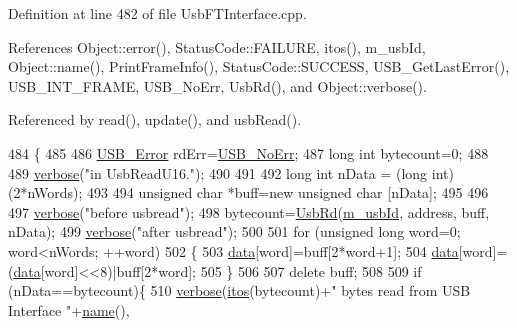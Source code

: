 Definition at line 482 of file Usb\+F\+T\+Interface.\+cpp.



References Object\+::error(), Status\+Code\+::\+F\+A\+I\+L\+U\+RE, itos(), m\+\_\+usb\+Id, Object\+::name(), Print\+Frame\+Info(), Status\+Code\+::\+S\+U\+C\+C\+E\+SS, U\+S\+B\+\_\+\+Get\+Last\+Error(), U\+S\+B\+\_\+\+I\+N\+T\+\_\+\+F\+R\+A\+ME, U\+S\+B\+\_\+\+No\+Err, Usb\+Rd(), and Object\+::verbose().



Referenced by read(), update(), and usb\+Read().


\begin{DoxyCode}
484                                                                \{
485   
486   \hyperlink{LALUsbML_8h_aa7e5a2302774d5aa1d48a2a1cfc46e86}{USB\_Error} rdErr=\hyperlink{LALUsbML_8h_ab44759ae95dd86cbc2855adf525c43cd}{USB\_NoErr};
487   \textcolor{keywordtype}{long} \textcolor{keywordtype}{int} bytecount=0;
488 
489     \hyperlink{classObject_a83d2db2df682907ea1115ad721c1c4a1}{verbose}(\textcolor{stringliteral}{"in UsbReadU16."});
490 
491 
492   \textcolor{keywordtype}{long} \textcolor{keywordtype}{int} nData = (\textcolor{keywordtype}{long} int)(2*nWords);
493   
494   \textcolor{keywordtype}{unsigned} \textcolor{keywordtype}{char} *buff=\textcolor{keyword}{new} \textcolor{keywordtype}{unsigned} \textcolor{keywordtype}{char} [nData];
495 
496 
497     \hyperlink{classObject_a83d2db2df682907ea1115ad721c1c4a1}{verbose}(\textcolor{stringliteral}{"before usbread"});   
498   bytecount=\hyperlink{LALUsbML_8h_a613b00e83691d644c8d1cf05c499392b}{UsbRd}(\hyperlink{classUsbFTInterface_a91df5c0547e8be460bc087e27afe05aa}{m\_usbId}, address, buff, nData);
499     \hyperlink{classObject_a83d2db2df682907ea1115ad721c1c4a1}{verbose}(\textcolor{stringliteral}{"after usbread"});
500 
501   \textcolor{keywordflow}{for} (\textcolor{keywordtype}{unsigned} \textcolor{keywordtype}{long} word=0; word<nWords; ++word)
502   \{
503     \hyperlink{namespaceshell_a5ea2525995cedc3efd69ea8a7f034d1e}{data}[word]=buff[2*word+1];
504     \hyperlink{namespaceshell_a5ea2525995cedc3efd69ea8a7f034d1e}{data}[word]=(\hyperlink{namespaceshell_a5ea2525995cedc3efd69ea8a7f034d1e}{data}[word]<<8)|buff[2*word];
505   \}
506 
507   \textcolor{keyword}{delete} buff;
508 
509   \textcolor{keywordflow}{if} (nData==bytecount)\{
510     \hyperlink{classObject_a83d2db2df682907ea1115ad721c1c4a1}{verbose}(\hyperlink{Tools_8h_af330027dbdafb9a30768b3613c553e60}{itos}(bytecount)+\textcolor{stringliteral}{" bytes read from USB Interface "}+\hyperlink{classObject_a300f4c05dd468c7bb8b3c968868443c1}{name}(),

\end{DoxyCode}
